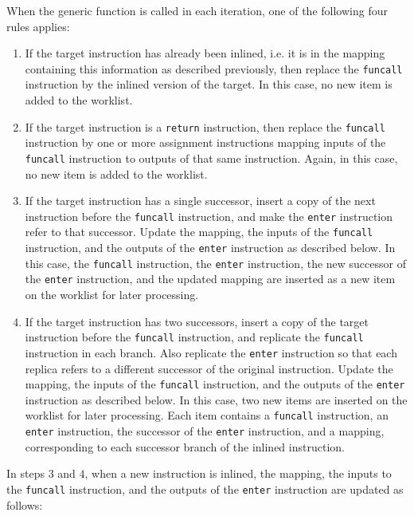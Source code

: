 When the generic function is called in each iteration, one of the
following four rules applies:

\begin{enumerate}
\item If the target instruction has already been inlined, i.e. it is
  in the mapping containing this information as described previously,
  then replace the \texttt{funcall} instruction by the inlined version
  of the target.  In this case, no new item is added to the worklist.
\item If the target instruction is a \texttt{return} instruction, then
  replace the \texttt{funcall} instruction by one or more assignment
  instructions mapping inputs of the \texttt{funcall} instruction to
  outputs of that same instruction.  Again, in this case, no new item
  is added to the worklist.
\item If the target instruction has a single successor, insert a copy of
  the next instruction before the \texttt{funcall} instruction, and
  make the \texttt{enter} instruction refer to that successor.  Update
  the mapping, the inputs of the \texttt{funcall} instruction, and the
  outputs of the \texttt{enter} instruction as described below.  In
  this case, the \texttt{funcall} instruction, the \texttt{enter}
  instruction, the new successor of the \texttt{enter} instruction,
  and the updated mapping are inserted as a new item on the worklist
  for later processing.
\item If the target instruction has two successors, insert a copy of
  the target instruction before the \texttt{funcall} instruction, and
  replicate the \texttt{funcall} instruction in each branch.  Also
  replicate the \texttt{enter} instruction so that each replica refers
  to a different successor of the original instruction.  Update the
  mapping, the inputs of the \texttt{funcall} instruction, and the
  outputs of the \texttt{enter} instruction as described below.  In
  this case, two new items are inserted on the worklist for later
  processing.  Each item contains a \texttt{funcall} instruction, an
  \texttt{enter} instruction, the successor of the \texttt{enter}
  instruction, and a mapping, corresponding to each successor branch
  of the inlined instruction.
\end{enumerate}

In steps $3$ and $4$, when a new instruction is inlined, the mapping,
the inputs to the \texttt{funcall} instruction, and the outputs of the
\texttt{enter} instruction are updated as follows:

